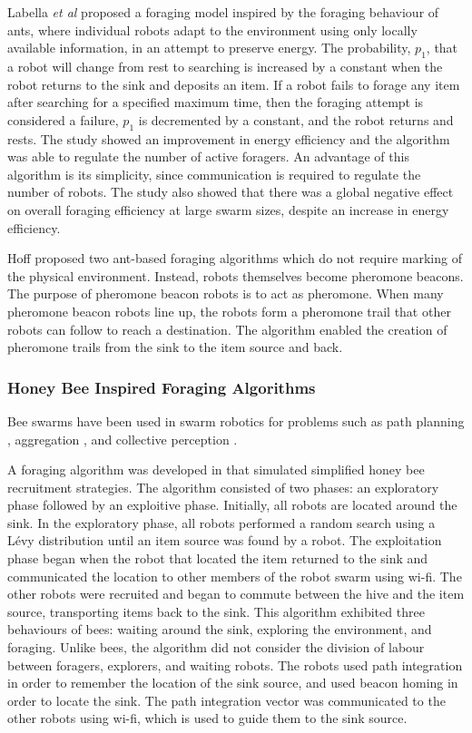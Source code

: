 Labella \textit{et al} \cite{labella2006division} proposed a foraging model inspired by the foraging behaviour of ants, where individual robots adapt to the environment using only locally available information, in an attempt to preserve energy. The probability, $p_1$, that a robot will change from rest to searching is increased by a constant when the robot returns to the sink and deposits an item. If a robot fails to forage any item after searching for a specified maximum time, then the foraging attempt is considered a failure, $p_1$ is decremented by a constant, and the robot returns and rests. The study showed an improvement in energy efficiency and the algorithm was able to regulate the number of active foragers. An advantage of this algorithm is its simplicity, since communication is required to regulate the number of robots. The study also showed that there was a global negative effect on overall foraging efficiency at large swarm sizes, despite an increase in energy efficiency.

Hoff \cite{hoff2010two} proposed two ant-based foraging algorithms which do not require marking of the physical environment. Instead, robots themselves become pheromone beacons. The purpose of pheromone beacon robots is to act as pheromone. When many pheromone beacon robots line up, the robots form a pheromone trail that other robots can follow to reach a destination. The algorithm enabled the creation of pheromone trails from the sink to the item source and back.

\subsubsection{Honey Bee Inspired Foraging Algorithms}
Bee swarms have been used in swarm robotics for problems such as path planning \cite{lin2009chaotic}, aggregation \cite{kernbach2009re}, and collective perception \cite{schmickl2007collective}. 

A foraging algorithm was developed in \cite{alers2014biologically} that simulated simplified honey bee recruitment strategies. The algorithm consisted of two phases: an exploratory phase followed by an exploitive phase. Initially, all robots are located around the sink. In the exploratory phase, all robots performed a random search using a L\'evy distribution until an item source was found by a robot. The exploitation phase began when the robot that located the item returned to the sink and communicated the location to other members of the robot swarm using wi-fi. The other robots were recruited and began to commute between the hive and the item source, transporting items back to the sink. This algorithm exhibited three behaviours of bees: waiting around the sink, exploring the environment, and foraging. Unlike bees, the algorithm did not consider the division of labour between foragers, explorers, and waiting robots. The robots used path integration in order to remember the location of the sink source, and used beacon homing in order to locate the sink. The path integration vector was communicated to the other robots using wi-fi, which is used to guide them to the sink source. 

